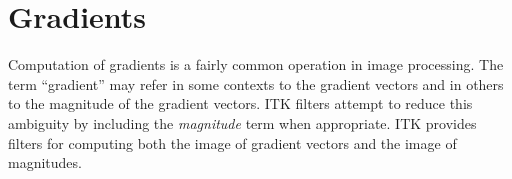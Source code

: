 




\section{Gradients}
\label{sec:GradientFiltering}

Computation of gradients is a fairly common operation in image processing. The
term ``gradient'' may refer in some contexts to the gradient vectors and in
others to the magnitude of the gradient vectors. ITK filters attempt to
reduce this ambiguity by including the \emph{magnitude} term when
appropriate. ITK provides filters for computing both the image of gradient
vectors and the image of magnitudes.







